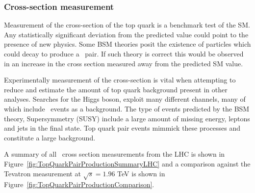 \subsubsection{Cross-section measurement}

Measurement of the cross-section of the top quark is a benchmark test of the SM. Any statistically significant deviation from the predicted value could point to the presence of new physics. Some BSM theories posit the existence of particles which could decay to produce a \ttbar\ pair. If such theory is correct this would be observed in an increase in the cross section measured away from the predicted SM value.

Experimentally measurement of the cross-section is vital when attempting to reduce and estimate the amount of top quark background present in other analyses. Searches for the Higgs boson, exploit many different channels, many of which include \ttbar\ events as a background. The type of events predicted by the BSM theory, Supersymmetry (SUSY) include a large amount of missing energy, leptons and jets in the final state. Top quark pair events mimmick these processes and constitute a large background.

A summary of all \ttbar\ cross section measurements from the LHC is shown in Figure~\ref{fig:TopQuarkPairProductionSummaryLHC} and a comparison against the Tevatron measurement at $\sqrt{s}=1.96$ TeV is shown in Figure~\ref{fig:TopQuarkPairProductionComparison}.

